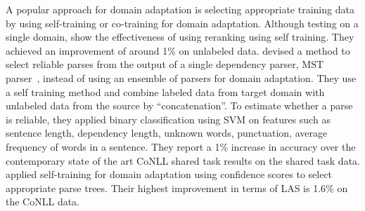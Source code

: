 A popular approach for domain adaptation is selecting appropriate training data by using self-training or co-training for domain adaptation. Although testing on a single domain, \citet{McClosky:2006:ESP:1220835.1220855,McClosky:2006:RSP:1220175.1220218}  show the effectiveness of using reranking using self training. They achieved an improvement of around 1\% on unlabeled data. 
\citet{kawahara2008learning} devised a method to select reliable parses from the output of a single dependency parser, MST parser~\cite{mcdonald2005non}, instead of using an ensemble of parsers for domain adaptation. 
They use a self training method and combine labeled data from target domain with unlabeled data from the source by ``concatenation''. To estimate whether a parse is reliable, they applied binary classification using SVM on features such as sentence length, dependency length, unknown words, punctuation, average frequency of words in a sentence. They report a 1\% increase in accuracy over the contemporary state of the art CoNLL shared task results on the shared task data.
\citet{yu2015domain} applied self-training for domain adaptation using confidence scores to select appropriate parse trees. Their highest improvement in terms of LAS is 1.6\% on the CoNLL data. %

